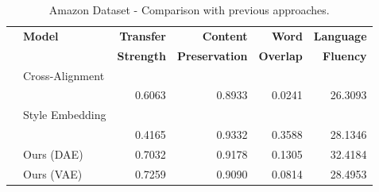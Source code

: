 \documentclass[11pt,a4paper]{article}
\begin{document}
\begin{table}[ht]
	\centering

	\begin{tabular}{| c | l | r | r | r | r |}
		\hline
		\multirow{2}{*}{
		} & \textbf{Model}        & \textbf{Transfer} & \textbf{Content}      & \textbf{Word}    & \textbf{Language} \\
		  &                       & \textbf{Strength} & \textbf{Preservation} & \textbf{Overlap} & \textbf{Fluency}  \\
		\hline
		\hline
		\multirow{2}{*}{
		} & Cross-Alignment       &                   &                       &                  &                   \\
		  & \citep{shen2017style} & 0.6063            & 0.8933                & 0.0241           & 26.3093           \\
		\hline
		\multirow{2}{*}{
		} & Style Embedding       &                   &                       &                  &                   \\
		  & \citep{fu2017style}   & 0.4165            & 0.9332                & 0.3588           & 28.1346           \\
		\hline
		  & Ours (DAE)            & 0.7032            & 0.9178                & 0.1305           & 32.4184           \\
		\hline
		  & Ours (VAE)            & 0.7259            & 0.9090                & 0.0814           & 28.4953           \\
		\hline
	\end{tabular}
	\caption{Amazon Dataset - Comparison with previous approaches.}
	\label{tab:amazon-comparison-previous}
\end{table}
\end{document}
